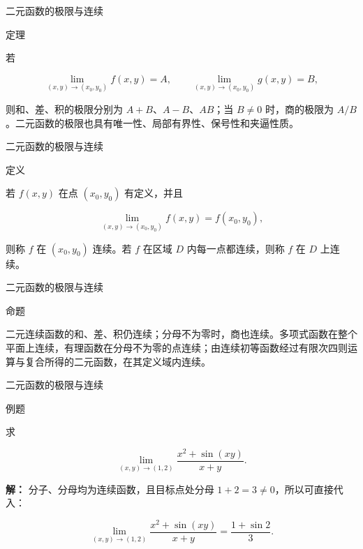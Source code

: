 \documentclass[aspectratio=169,10pt,fontset=fandol]{ctexbeamer}
\begin{document}
\begin{frame}[t,fragile]{二元函数的极限与连续}
\normalsize
\begin{block}{定理}
{\normalsize


	若

	\[

	\lim_{(x,y)\to(x_0,y_0)}f(x,y)=A,\qquad

	\lim_{(x,y)\to(x_0,y_0)}g(x,y)=B,

	\]

	则和、差、积的极限分别为 \(A+B\)、\(A-B\)、\(AB\)；当 \(B\neq0\) 时，商的极限为 \(A/B\)。二元函数的极限也具有唯一性、局部有界性、保号性和夹逼性质。


}
\end{block}
\end{frame}
\begin{frame}[t,fragile]{二元函数的极限与连续}
\normalsize
\begin{block}{定义}
{\normalsize


	若 \(f(x,y)\) 在点 \((x_0,y_0)\) 有定义，并且

	\[

	\lim_{(x,y)\to(x_0,y_0)}f(x,y)=f(x_0,y_0),

	\]

	则称 \(f\) 在 \((x_0,y_0)\) 连续。若 \(f\) 在区域 \(D\) 内每一点都连续，则称 \(f\) 在 \(D\) 上连续。


}
\end{block}
\end{frame}
\begin{frame}[t,fragile]{二元函数的极限与连续}
\normalsize
\begin{block}{命题}
{\normalsize


	二元连续函数的和、差、积仍连续；分母不为零时，商也连续。多项式函数在整个平面上连续，有理函数在分母不为零的点连续；由连续初等函数经过有限次四则运算与复合所得的二元函数，在其定义域内连续。


}
\end{block}
\end{frame}
\begin{frame}[t,fragile]{二元函数的极限与连续}
\normalsize
\begin{block}{例题}
{\normalsize


	求

	\[

	\lim_{(x,y)\to(1,2)}

	\frac{x^2+\sin(xy)}{x+y}.

	\]


}
\end{block}
\pause
{\normalsize
\textbf{解：}
分子、分母均为连续函数，且目标点处分母 \(1+2=3\neq0\)，所以可直接代入：

	\[

	\lim_{(x,y)\to(1,2)}

	\frac{x^2+\sin(xy)}{x+y}

	=\frac{1+\sin2}{3}.

	\]


}
\end{frame}
\end{document}

